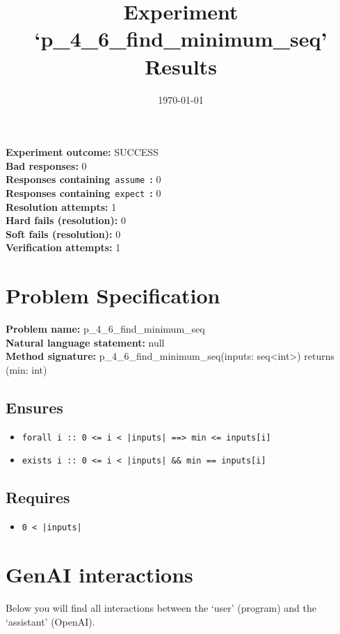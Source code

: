 \documentclass{article}
\begin{document}
\title{Experiment `p\_4\_6\_find\_minimum\_seq' Results}
\author{\today}
\date{}
\maketitle
\textbf{Experiment outcome: }SUCCESS
\\\textbf{Bad responses: }0
\\\textbf{Responses containing}~\texttt{assume}~\textbf{: }0
\\\textbf{Responses containing}~\texttt{expect}~\textbf{: }0
\\\textbf{Resolution attempts: }1
\\\textbf{Hard fails (resolution): }0
\\\textbf{Soft fails (resolution): }0
\\\textbf{Verification attempts: }1
\section*{Problem Specification}
\textbf{Problem name: }p\_4\_6\_find\_minimum\_seq
\\\textbf{Natural language statement: }null
\\\textbf{Method signature: }p\_4\_6\_find\_minimum\_seq(inputs: seq<int>) returns (min: int)
\subsection*{Ensures}
\begin{itemize}
\item \texttt{forall i :: 0 <= i < |inputs| ==> min <= inputs[i]}
\item \texttt{exists i :: 0 <= i < |inputs| \&\& min == inputs[i]}
\end{itemize}
\subsection*{Requires}
\begin{itemize}
\item \texttt{0 < |inputs|}
\end{itemize}
\clearpage
\section*{GenAI interactions}
Below you will find all interactions between the `user' (program) and the `assistant' (OpenAI).
\end{document}
